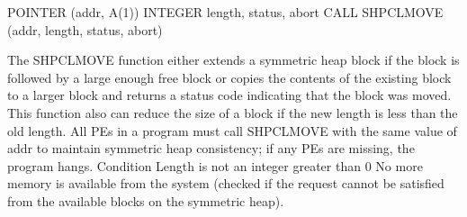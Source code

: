 \synF   %
POINTER (addr, A(1))
INTEGER length, status, abort
CALL SHPCLMOVE (addr, length, status, abort)

 {       The SHPCLMOVE function either extends a symmetric  heap	block  if  the
       block  is  followed by a large enough free block or copies the contents
       of the existing block to a larger  block	 and  returns  a  status  code
       indicating that the block was moved.  This function also can reduce the
       size of a block if the new length is less than  the  old	 length.   All
       \ac{PE}s  in a program must call SHPCLMOVE with the
       same value of addr to maintain symmetric heap consistency; if  any  \ac{PE}s
       are missing, the program hangs.
 }
{
{}
\desR{ }
 {Condition}
 {Length is not an integer greater than 0}
 { No more memory is available from the system (checked  if the  request  cannot  be	satisfied from the available blocks on the symmetric heap).}
}%
\notesB{ }   
\eAPI 